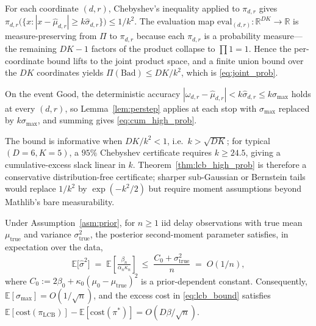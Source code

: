\documentclass[opre,dblanonrev]{informs4}
\renewenvironment{proof}{\Trivlist\item[\hspace*{1em}\hskip\labelsep{\itshape Proof.\enskip}]\ignorespaces}{\endTrivlist\addvspace{0pt}}
\begin{document}
\begin{proof}[Proof sketch (full proof in Appendix~\ref{app:high_prob_proof})]
For each coordinate $(d,r)$, Chebyshev's inequality applied to
$\pi_{d,r}$ gives
$\pi_{d,r}\bigl(\{x : |x - \hat\mu_{d,r}| \geq k\hat\sigma_{d,r}\}\bigr)
\leq 1/k^2$. The evaluation map
$\mathrm{eval}_{(d,r)} : \mathbb{R}^{DK} \to \mathbb{R}$ is
measure-preserving from $\Pi$ to $\pi_{d,r}$ because each $\pi_{d,r}$
is a probability measure---the remaining $DK - 1$ factors of the
product collapse to $\prod 1 = 1$. Hence the per-coordinate bound
lifts to the joint product space, and a finite union bound over the
$DK$ coordinates yields $\Pi(\mathrm{Bad}) \leq DK/k^2$, which is
\eqref{eq:joint_prob}.

On the event $\mathrm{Good}$, the deterministic accuracy
$|\omega_{d,r} - \hat\mu_{d,r}| < k\hat\sigma_{d,r} \leq k\sigma_{\max}$
holds at every $(d,r)$, so Lemma~\ref{lem:perstep} applies at each
stop with $\sigma_{\max}$ replaced by $k\sigma_{\max}$, and summing
gives \eqref{eq:cum_high_prob}.
\end{proof}

\begin{remark}\label{rem:k_selection}
The bound is informative when $DK/k^2 < 1$, i.e.\ $k > \sqrt{DK}$;
for typical $(D{=}6, K{=}5)$, a $95\%$ Chebyshev certificate requires
$k\!\geq\!24.5$, giving a cumulative-excess slack linear in $k$.
Theorem~\ref{thm:lcb_high_prob} is therefore a conservative
distribution-free certificate; sharper sub-Gaussian or Bernstein
tails would replace $1/k^2$ by $\exp(-k^2/2)$ but require
moment assumptions beyond Mathlib's bare measurability.
\end{remark}

\begin{lemma}\label{lem:contraction}
Under Assumption~\ref{asm:prior}, for $n\geq 1$ iid delay observations
with true mean $\mu_{\mathrm{true}}$ and variance $\sigma_{\mathrm{true}}^2$,
the posterior second-moment parameter satisfies, in expectation over
the data,
\[
\mathbb{E}\bigl[\hat\sigma^2\bigr]
\;=\;\mathbb{E}\!\left[\tfrac{\beta_n}{\alpha_n\kappa_n}\right]
\;\leq\; \frac{C_0 + \sigma_{\mathrm{true}}^2}{n}
\;=\; O(1/n),
\]
where $C_0 := 2\beta_0 + \kappa_0(\mu_0-\mu_{\mathrm{true}})^2$ is a
prior-dependent constant.
Consequently, $\mathbb{E}[\sigma_{\max}] = O(1/\sqrt{n})$, and the
excess cost in \eqref{eq:lcb_bound} satisfies
$\mathbb{E}[\mathrm{cost}(\pi_{\mathrm{LCB}})] - \mathbb{E}[\mathrm{cost}(\pi^*)] = O(D\beta/\sqrt{n})$.
\end{lemma}
\end{document}
